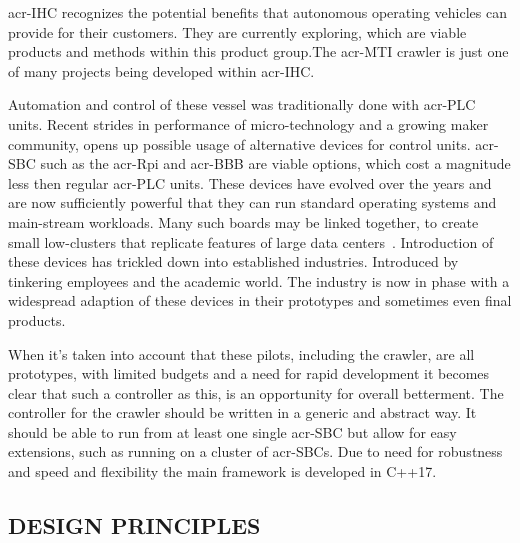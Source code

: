 \gls{acr-IHC} recognizes the potential benefits that autonomous operating vehicles can provide for their customers. They
are currently exploring, which are viable products and methods within this product group.The \gls{acr-MTI} crawler is
just one of many projects being developed within \gls{acr-IHC}.

Automation and control of these vessel was traditionally done with \gls{acr-PLC} units. Recent strides in
performance of micro-technology and a growing maker community, opens up possible usage of alternative devices for
control units. \gls{acr-SBC} such as the \gls{acr-Rpi} and \gls{acr-BBB} are viable options, which
cost a magnitude less then regular \gls{acr-PLC} units. These devices have evolved over the years and are now
sufficiently powerful that they can run standard operating systems and main-stream workloads. Many such boards may be
linked together, to create small low-clusters that replicate features of large data
centers~\cite{johnston_commodity_2018}. Introduction of these devices has trickled down into established industries.
Introduced by tinkering employees and the academic world. The industry is now in phase with a widespread adaption of
these devices in their prototypes and sometimes even final products.

When it's taken into account that these pilots, including the crawler, are all prototypes, with limited budgets and a
need for rapid development it becomes clear that such a controller as this, is an opportunity for overall betterment.
The controller for the crawler should be written in a generic and abstract way. It should be able to run from at least
one single \gls{acr-SBC} but allow for easy extensions, such as running on a cluster of \gls{acr-SBC}s. Due to need for
robustness and speed and flexibility the main framework is developed in C++17.

\subsection{DESIGN PRINCIPLES}

